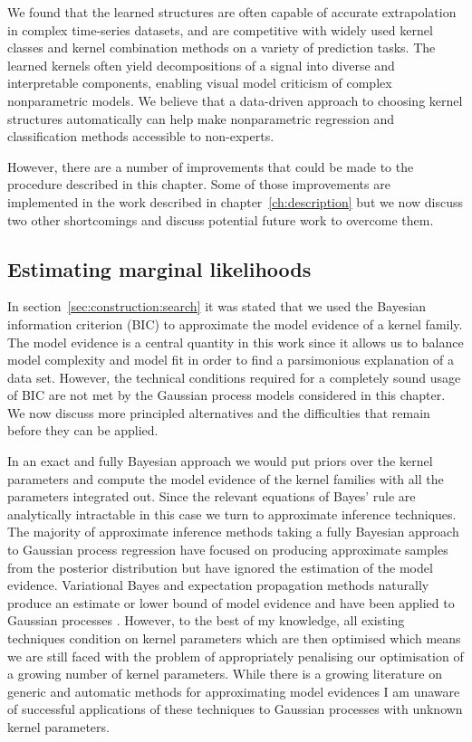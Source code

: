 We found that the learned structures are often capable of accurate extrapolation in complex time-series datasets, and are competitive with widely used kernel classes and kernel combination methods on a variety of prediction tasks.
The learned kernels often yield decompositions of a signal into diverse and interpretable components, enabling visual model criticism of complex nonparametric models.
We believe that a data-driven approach to choosing kernel structures automatically can help make nonparametric regression and classification methods accessible to non-experts.

However, there are a number of improvements that could be made to the procedure described in this chapter.
Some of those improvements are implemented in the work described in chapter~\ref{ch:description} but we now discuss two other shortcomings and discuss potential future work to overcome them.

\subsection{Estimating marginal likelihoods}

In section~\ref{sec:construction:search} it was stated that we used the Bayesian information criterion (BIC) \citep{Schwarz1978-wp} to approximate the model evidence of a kernel family.
The model evidence is a central quantity in this work since it allows us to balance model complexity and model fit in order to find a parsimonious explanation of a data set.
However, the technical conditions required for a completely sound usage of BIC are not met by the Gaussian process models considered in this chapter.
We now discuss more principled alternatives and the difficulties that remain before they can be applied.

In an exact and fully Bayesian approach we would put priors over the kernel parameters and compute the model evidence of the kernel families with all the parameters integrated out.
Since the relevant equations of Bayes' rule are analytically intractable in this case we turn to approximate inference techniques.
The majority of approximate inference methods taking a fully Bayesian approach to Gaussian process regression have focused on producing approximate samples from the posterior distribution \citep[e.g.][]{Murray2010-hv, Lloyd2012-sb, Snoek2012-ri} but have ignored the estimation of the model evidence.
Variational Bayes and expectation propagation methods naturally produce an estimate or lower bound of model evidence and have been applied to Gaussian processes \citep[e.g.][]{Rasmussen2006-ml, Hensman2013-ox}.
However, to the best of my knowledge, all existing techniques condition on kernel parameters which are then optimised which means we are still faced with the problem of appropriately penalising our optimisation of a growing number of kernel parameters.
While there is a growing literature on generic and automatic methods for approximating model evidences \citep[e.g.][]{Skilling2006-ez, Gerrish_undated-zh, Feroz2013-dj} I am unaware of successful applications of these techniques to Gaussian processes with unknown kernel parameters.

